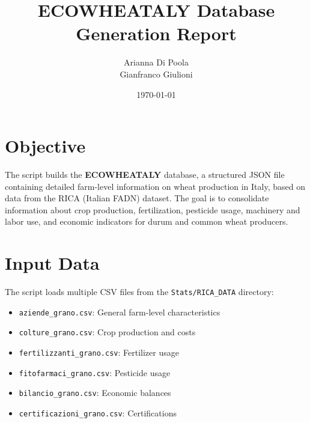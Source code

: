 \documentclass[11pt,a4paper]{article}
\begin{document}
\title{ECOWHEATALY Database Generation Report}
\author{Arianna Di Poola \\ Gianfranco Giulioni}
\date{\today}
\maketitle

\section*{Objective}
The script builds the \textbf{ECOWHEATALY} database, a structured JSON file containing detailed farm-level information on wheat production in Italy, based on data from the RICA (Italian FADN) dataset. The goal is to consolidate information about crop production, fertilization, pesticide usage, machinery and labor use, and economic indicators for durum and common wheat producers.

\section*{Input Data}
The script loads multiple CSV files from the \texttt{Stats/RICA\_DATA} directory:

\begin{itemize}
    \item \texttt{aziende\_grano.csv}: General farm-level characteristics
    \item \texttt{colture\_grano.csv}: Crop production and costs
    \item \texttt{fertilizzanti\_grano.csv}: Fertilizer usage
    \item \texttt{fitofarmaci\_grano.csv}: Pesticide usage
    \item \texttt{bilancio\_grano.csv}: Economic balances
    \item \texttt{certificazioni\_grano.csv}: Certifications
\end{itemize}
\end{document}
